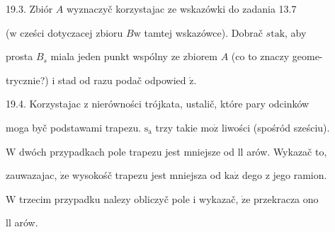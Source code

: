 \documentclass[a4paper,12pt]{article}
\begin{document}
19.3. Zbiór $A$ wyznaczyč korzystajac ze wskazówki do zadania 13.7

($\mathrm{w}$ cześci dotyczacej zbioru $B \mathrm{w}$ tamtej wskazówce). Dobrač $s \mathrm{t}\mathrm{a}\mathrm{k}$, aby

prosta $B_{s}$ miala jeden punkt wspólny ze zbiorem $A$ (co to znaczy geome-

trycznie?) $\mathrm{i}$ stad od razu podač odpowied $\acute{\mathrm{z}}.$

19.4. Korzystajac $\mathrm{z}$ nierówności trójkata, ustalič, które pary odcinków

moga byč podstawami trapezu. $\mathrm{s}_{\mathrm{a}}$ trzy takie $\mathrm{m}\mathrm{o}\dot{\mathrm{z}}$ liwości (spośród sześciu).

$\mathrm{W}$ dwóch przypadkach pole trapezu jest mniejsze od ll arów. Wykazač to,

zauwazajac, $\dot{\mathrm{z}}\mathrm{e}$ wysokośč trapezu jest mniejsza od $\mathrm{k}\mathrm{a}\dot{\mathrm{z}}$ dego $\mathrm{z}$ jego ramion.

$\mathrm{W}$ trzecim przypadku nalezy obliczyč pole $\mathrm{i}$ wykazač, $\dot{\mathrm{z}}\mathrm{e}$ przekracza ono

ll arów.
\end{document}
